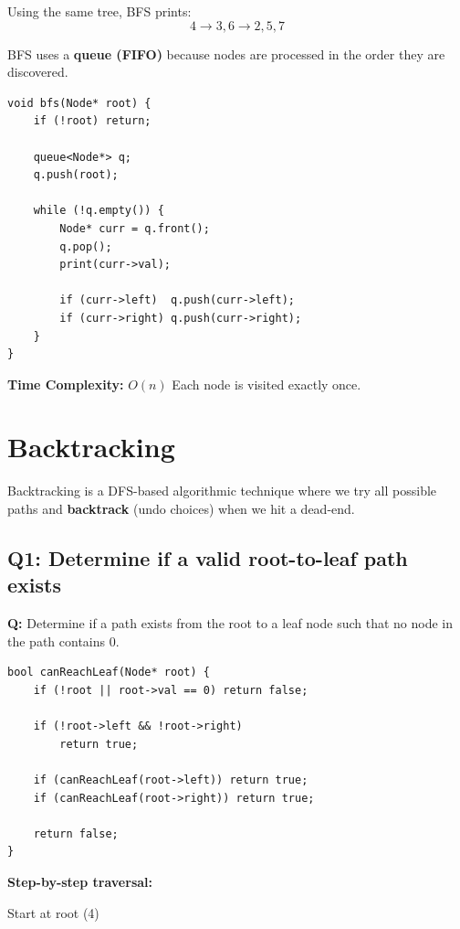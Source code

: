 \documentclass{article}
\begin{document}
Using the same tree, BFS prints:
\[
4 \rightarrow 3,6 \rightarrow 2,5,7
\]

BFS uses a \textbf{queue (FIFO)} because nodes are processed in the order they are discovered.

\begin{verbatim}
void bfs(Node* root) {
    if (!root) return;

    queue<Node*> q;
    q.push(root);

    while (!q.empty()) {
        Node* curr = q.front(); 
        q.pop();
        print(curr->val);

        if (curr->left)  q.push(curr->left);
        if (curr->right) q.push(curr->right);
    }
}
\end{verbatim}

\textbf{Time Complexity:} $O(n)$  
Each node is visited exactly once.
\section{Backtracking}

Backtracking is a DFS-based algorithmic technique where we try all possible paths
and \textbf{backtrack} (undo choices) when we hit a dead-end.



\subsection{Q1: Determine if a valid root-to-leaf path exists}

\textbf{Q:} Determine if a path exists from the root to a leaf node such that no node in the path contains $0$.

\begin{verbatim}
bool canReachLeaf(Node* root) {
    if (!root || root->val == 0) return false;

    if (!root->left && !root->right)
        return true;

    if (canReachLeaf(root->left)) return true;
    if (canReachLeaf(root->right)) return true;

    return false;
}
\end{verbatim}

\textbf{Step-by-step traversal:}

\begin{center}

{\small Start at root (4)}
\end{center}
\end{document}
